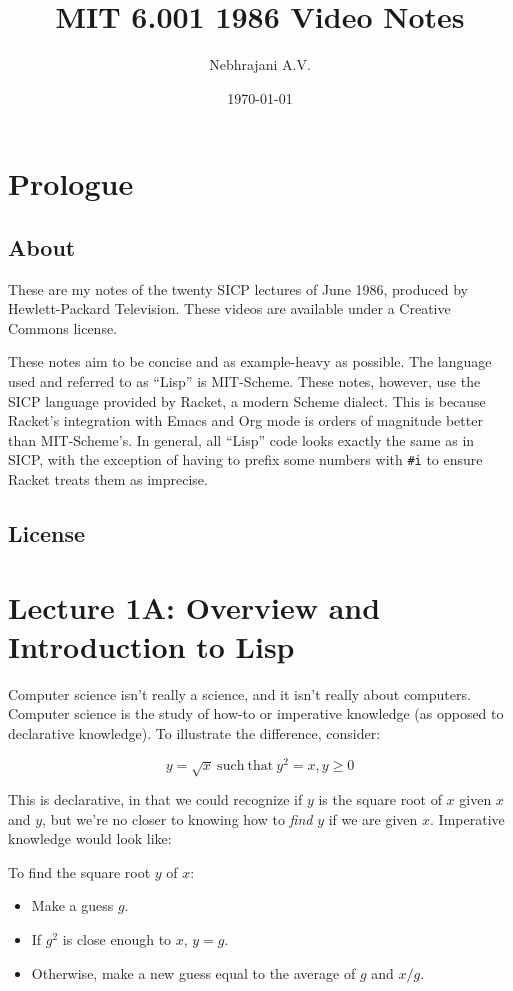 \documentclass[9pt]{report}
\author{Nebhrajani A.V.}
\date{\today}
\title{MIT 6.001 1986 Video Notes}
\begin{document}
\maketitle
\tableofcontents

\newpage

\chapter{Prologue}
\label{sec:org9507f26}
\section{About}
\label{sec:org6330b46}
These are my notes of the twenty SICP lectures of June 1986,
produced by Hewlett-Packard Television. These videos are available
under a Creative Commons license.

These notes aim to be concise and as example-heavy as possible. The
language used and referred to as ``Lisp'' is MIT-Scheme. These notes,
however, use the SICP language provided by Racket, a modern Scheme
dialect. This is because Racket's integration with Emacs and
Org mode is orders of magnitude better than MIT-Scheme's. In
general, all ``Lisp'' code looks exactly the same as in SICP, with the
exception of having to prefix some numbers with \texttt{\#i} to ensure
Racket treats them as imprecise.

\section{License}
\label{sec:orgd564c38}
\doclicenseThis

\chapter{Lecture 1A: Overview and Introduction to Lisp}
\label{sec:orge892336}

Computer science isn't really a science, and it isn't really about
computers. Computer science is the study of how-to or imperative
knowledge (as opposed to declarative knowledge). To illustrate the
difference, consider:

$$y = \sqrt{x} \mathrm{~such~that~} y^2=x, y \geq 0$$

This is declarative, in that we could recognize if \(y\) is the square
root of \(x\) given \(x\) and \(y\), but we're no closer to knowing how to
\emph{find} \(y\) if we are given \(x\). Imperative knowledge would look
like:

To find the square root \(y\) of \(x\):
\begin{itemize}
\item Make a guess \(g\).
\item If \(g^2\) is close enough to \(x\), \(y=g\).
\item Otherwise, make a new guess equal to the average of \(g\) and \(x/g\).
\end{itemize}
\end{document}
